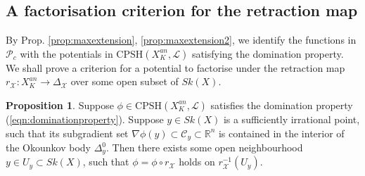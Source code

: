 \documentclass[a4paper]{article}
\theoremstyle{definition}
\newtheorem{prop}[thm]{Proposition}
\newcommand{\R}{\mathbb{R}}
\begin{document}
	
	

	

	

	
	
	
	
	





	\subsection{A factorisation criterion for the retraction map}\label{sec:factorisation}
	
	
	
	
	
	

	
	By Prop. \ref{prop:maxextension}, \ref{prop:maxextension2}, we identify the functions in $\mathcal{P}_c$ with the potentials in $\text{CPSH}(X_K^{an},\mathcal{L})$ satisfying the domination property. We shall prove a criterion for a potential to factorise under the retraction map $r_\mathcal{X}: X_K^{an}\to \Delta_{\mathcal{X}}$ over some open subset of $Sk(X)$.
	
	
\begin{prop}\label{prop:factorisation}
Suppose  $\phi \in \text{CPSH}(X_K^{an},\mathcal{L})$ satisfies the domination property (\ref{eqn:dominationproperty}). 
Suppose $y\in Sk(X)$ is a sufficiently irrational point, such that its subgradient set $\nabla \phi(y)\subset \mathcal{C}_y\subset \R^n$
is contained in the interior of the Okounkov body $\Delta_y^0$. Then there exists some open neighbourhood $y\in U_y\subset  Sk(X)$, such that  $\phi= \phi\circ r_{\mathcal{X}}$  holds on  $r_\mathcal{X}^{-1}(U_y)$.
\end{prop}
	
	
	
\end{document}
